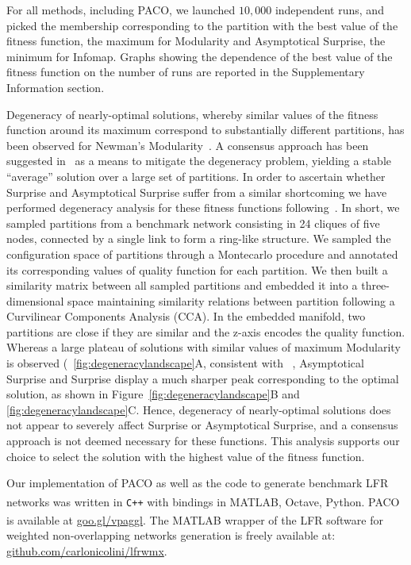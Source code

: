 For all methods, including PACO, we launched $10,000$ independent runs, and picked the membership corresponding to the partition with the best value of the fitness function, the maximum for Modularity and Asymptotical Surprise, the minimum for Infomap. Graphs showing the dependence of the best value of the fitness function on the number of runs are reported in the Supplementary Information section.


Degeneracy of nearly-optimal solutions, whereby similar values of the fitness function around its maximum correspond to substantially different partitions, has been observed for Newman's Modularity~\cite{good2009}. A consensus approach has been suggested in~\cite{lancichinetti2012} as a means to mitigate the degeneracy problem, yielding a stable ``average'' solution over a large set of partitions. In order to ascertain whether Surprise and Asymptotical Surprise suffer from a similar shortcoming we have performed degeneracy analysis for these fitness functions following~\cite{good2009}.
In short, we sampled partitions from a benchmark network consisting in 24 cliques of five nodes, connected by a single link to form a ring-like structure.
We sampled the configuration space of partitions through a Montecarlo procedure and annotated its corresponding values of quality function for each partition. We then built a similarity matrix between all sampled partitions and embedded it into a three-dimensional space maintaining similarity relations between partition following a Curvilinear Components Analysis (CCA). In the embedded manifold, two partitions are close if they are similar and the z-axis encodes the quality function. Whereas a large plateau of solutions with similar values of maximum Modularity is observed (~\ref{fig:degeneracylandscape}A, consistent with ~\cite{good2009}, Asymptotical Surprise and Surprise display a much sharper peak corresponding to the optimal solution, as shown in Figure~\ref{fig:degeneracylandscape}B and \ref{fig:degeneracylandscape}C. Hence, degeneracy of nearly-optimal solutions does not appear to severely affect Surprise or Asymptotical Surprise, and a consensus approach is not deemed necessary for these functions.
This analysis supports our choice to select the solution with the highest value of the fitness function.

Our implementation of PACO as well as the code to generate benchmark LFR networks was written in \texttt{C++} with bindings in MATLAB\textsuperscript{\textregistered}, Octave, Python. PACO is available at \url{goo.gl/vpaggl}. The MATLAB\textsuperscript{\textregistered} wrapper of the LFR software for weighted non-overlapping networks generation is freely available at: \newline \url{github.com/carlonicolini/lfrwmx}.


